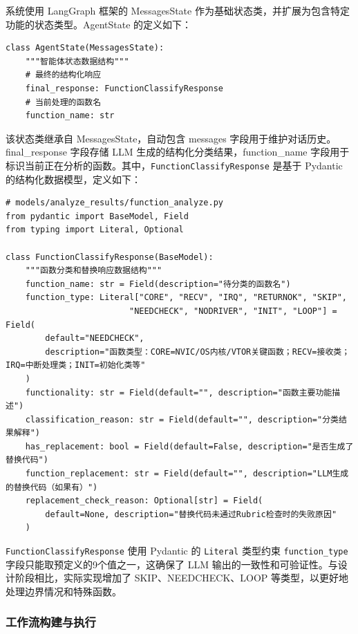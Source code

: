 系统使用 LangGraph 框架的 MessagesState 作为基础状态类，并扩展为包含特定功能的状态类型。AgentState 的定义如下：

\begin{lstlisting}[style=Python,abovecaptionskip=0pt,belowcaptionskip=0pt]
class AgentState(MessagesState):
    """智能体状态数据结构"""
    # 最终的结构化响应
    final_response: FunctionClassifyResponse
    # 当前处理的函数名
    function_name: str
\end{lstlisting}

该状态类继承自 MessagesState，自动包含 messages 字段用于维护对话历史。final\_response 字段存储 LLM 生成的结构化分类结果，function\_name 字段用于标识当前正在分析的函数。其中，\texttt{FunctionClassifyResponse} 是基于 Pydantic 的结构化数据模型，定义如下：

\begin{lstlisting}[style=Python,abovecaptionskip=0pt,belowcaptionskip=0pt]
# models/analyze_results/function_analyze.py
from pydantic import BaseModel, Field
from typing import Literal, Optional

class FunctionClassifyResponse(BaseModel):
    """函数分类和替换响应数据结构"""
    function_name: str = Field(description="待分类的函数名")
    function_type: Literal["CORE", "RECV", "IRQ", "RETURNOK", "SKIP",
                         "NEEDCHECK", "NODRIVER", "INIT", "LOOP"] = Field(
        default="NEEDCHECK",
        description="函数类型：CORE=NVIC/OS内核/VTOR关键函数；RECV=接收类；IRQ=中断处理类；INIT=初始化类等"
    )
    functionality: str = Field(default="", description="函数主要功能描述")
    classification_reason: str = Field(default="", description="分类结果解释")
    has_replacement: bool = Field(default=False, description="是否生成了替换代码")
    function_replacement: str = Field(default="", description="LLM生成的替换代码（如果有）")
    replacement_check_reason: Optional[str] = Field(
        default=None, description="替换代码未通过Rubric检查时的失败原因"
    )
\end{lstlisting}

\texttt{FunctionClassifyResponse} 使用 Pydantic 的 \texttt{Literal} 类型约束 \texttt{function\_type} 字段只能取预定义的9个值之一，这确保了 LLM 输出的一致性和可验证性。与设计阶段相比，实际实现增加了 SKIP、NEEDCHECK、LOOP 等类型，以更好地处理边界情况和特殊函数。

\subsubsection{工作流构建与执行}

